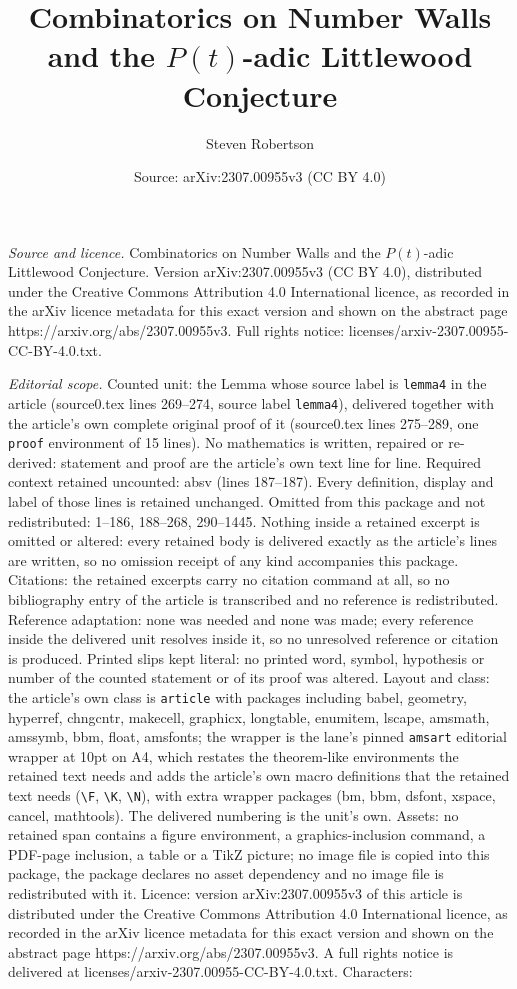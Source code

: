 \documentclass[10pt,a4paper]{amsart}
\title[Combinatorics on Number Walls and the $P(t)$-adic Littlewood]{Combinatorics on Number Walls and the $P(t)$-adic Littlewood Conjecture}
\author{Steven Robertson}
\date{Source: arXiv:2307.00955v3 (CC BY 4.0)}
\begin{document}
\maketitle

\noindent\emph{Source and licence.} Combinatorics on Number Walls and the $P(t)$-adic Littlewood Conjecture. Version arXiv:2307.00955v3 (CC BY 4.0), distributed under the Creative Commons Attribution 4.0 International licence, as recorded in the arXiv licence metadata for this exact version and shown on the abstract page https://arxiv.org/abs/2307.00955v3. Full rights notice: licenses/arxiv-2307.00955-CC-BY-4.0.txt.\par\smallskip

\noindent\textit{Editorial scope.} Counted unit: the Lemma whose source label is \texttt{lemma4} in the article (source0.tex lines 269--274, source label \texttt{lemma4}), delivered together with the article's own complete original proof of it (source0.tex lines 275--289, one \texttt{proof} environment of 15 lines). No mathematics is written, repaired or re-derived: statement and proof are the article's own text line for line. Required context retained uncounted: absv (lines 187--187). Every definition, display and label of those lines is retained unchanged. Omitted from this package and not redistributed: 1--186, 188--268, 290--1445. Nothing inside a retained excerpt is omitted or altered: every retained body is delivered exactly as the article's lines are written, so no omission receipt of any kind accompanies this package. Citations: the retained excerpts carry no citation command at all, so no bibliography entry of the article is transcribed and no reference is redistributed. Reference adaptation: none was needed and none was made; every reference inside the delivered unit resolves inside it, so no unresolved reference or citation is produced. Printed slips kept literal: no printed word, symbol, hypothesis or number of the counted statement or of its proof was altered. Layout and class: the article's own class is \texttt{article} with packages including babel, geometry, hyperref, chngcntr, makecell, graphicx, longtable, enumitem, lscape, amsmath, amssymb, bbm, float, amsfonts; the wrapper is the lane's pinned \texttt{amsart} editorial wrapper at 10pt on A4, which restates the theorem-like environments the retained text needs and adds the article's own macro definitions that the retained text needs (\texttt{\textbackslash F}, \texttt{\textbackslash K}, \texttt{\textbackslash N}), with extra wrapper packages (bm, bbm, dsfont, xspace, cancel, mathtools). The delivered numbering is the unit's own. Assets: no retained span contains a figure environment, a graphics-inclusion command, a PDF-page inclusion, a table or a TikZ picture; no image file is copied into this package, the package declares no asset dependency and no image file is redistributed with it. Licence: version arXiv:2307.00955v3 of this article is distributed under the Creative Commons Attribution 4.0 International licence, as recorded in the arXiv licence metadata for this exact version and shown on the abstract page https://arxiv.org/abs/2307.00955v3. A full rights notice is delivered at licenses/arxiv-2307.00955-CC-BY-4.0.txt. Characters: 
\end{document}
